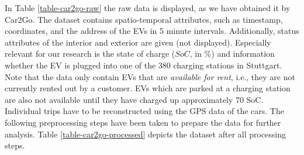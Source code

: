 \documentclass[a4paper, 12pt]{article}
\begin{document}
In Table \ref{table-car2go-raw} the raw data is displayed, as we have obtained it
by Car2Go. The dataset contains spatio-temporal attributes, such as timestamp,
coordinates, and the address of the EVs in 5 minute intervals. Additionally,
status attributes of the interior and exterior are given (not displayed).
Especially relevant for our research is the state of charge (\(SoC\), in \%) and
information whether the EV is plugged into one of the 380 charging stations in
Stuttgart. Note that the data only contain EVs that are \emph{available for rent},
i.e., they are not currently rented out by a customer. EVs which are parked at a
charging station are also not available until they have charged up approximately
70 SoC. Individual trips have to be reconstructed using the GPS data of the
cars. The following preprocessing steps have been taken to prepare the data for
further analysis. Table \ref{table-car2go-processed} depicts the dataset after all
processing steps.
\end{document}
